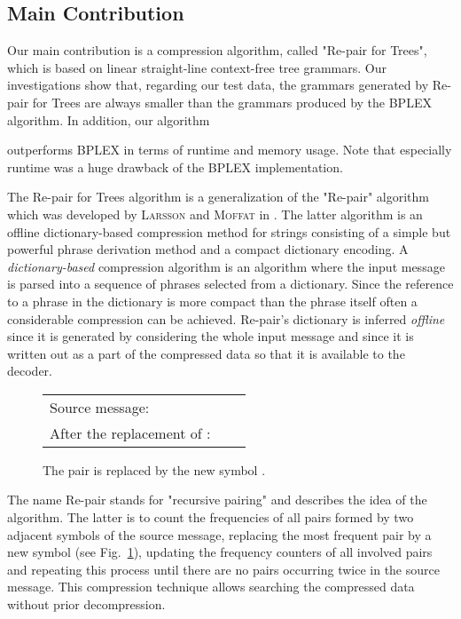 \documentclass[12pt]{llncs}
\begin{document}
\subsection{Main Contribution}

Our main contribution is a compression algorithm, called "Re-pair for
Trees", which is based on linear straight-line context-free tree
grammars. Our investigations show that, regarding our test data, the
grammars generated by Re-pair for Trees are always smaller than the
grammars produced by the BPLEX algorithm. In addition, our algorithm

outperforms BPLEX 
in terms of runtime and memory usage. Note that especially 
runtime was a huge drawback of the BPLEX implementation.

The Re-pair for Trees algorithm is a generalization 
of the "Re-pair" algorithm which was developed by \textsc{Larsson} and
\textsc{Moffat} in \cite{larsson2000off}. The latter algorithm is an
offline dictionary-based compression method for strings consisting of
a simple but powerful phrase derivation method and a compact
dictionary encoding. A \emph{dictionary-based} compression algorithm
is an algorithm where the input message is parsed into a sequence of
phrases selected from a dictionary. Since the reference to a phrase in
the dictionary is more compact than the phrase itself often a
considerable compression can be achieved. Re-pair's dictionary is
inferred \emph{offline} since it is generated by considering the whole 
input message and since it is written out as a 
part of the compressed data so that it is available to the decoder.
\begin{figure}[t]
	\centering
	\renewcommand{\arraystretch}{2.0}
	\begin{tabular}{lcc}
		Source message:&&{\renewcommand{\arraystretch}{1.0}
			}\\
		After the replacement of :&&{\renewcommand{\arraystretch}{1.0}
			}
	\end{tabular}
	\caption{The pair  is replaced by the new symbol .}
	\label{fig:repalg}
\end{figure}
The name Re-pair stands for "recursive pairing" and describes the idea
of the algorithm. The latter is to count the frequencies of all pairs
formed by two adjacent symbols of the source message, replacing the
most frequent pair by a new symbol (see Fig.~\ref{fig:repalg}),
updating the frequency counters of all involved pairs and repeating
this process until there are no pairs occurring twice in 
the source message. This compression technique allows 
searching the compressed data without prior decompression.
\end{document}
